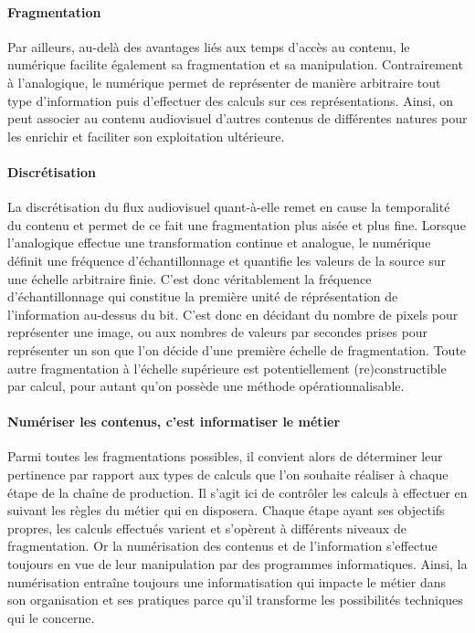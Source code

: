 \paragraph{Fragmentation}
Par ailleurs, au-delà des avantages liés aux temps d'accès au contenu, le numérique facilite également sa fragmentation et sa manipulation.
Contrairement à l'analogique, le numérique permet de représenter de manière arbitraire tout type d'information puis d'effectuer des calculs sur ces représentations. 
Ainsi, on peut associer au contenu audiovisuel d'autres contenus de différentes natures pour les enrichir et faciliter son exploitation ultérieure.

\paragraph{Discrétisation}
La discrétisation du flux audiovisuel quant-à-elle remet en cause la temporalité du contenu et permet de ce fait une fragmentation plus aisée et plus fine. 
Lorsque l'analogique effectue une transformation continue et analogue, le numérique définit une fréquence d'échantillonnage et quantifie les valeurs de la source sur une échelle arbitraire finie. 
C'est donc véritablement la fréquence d'échantillonnage qui constitue la première unité de réprésentation de l'information au-dessus du bit.
C'est donc en décidant du nombre de pixels pour représenter une image, ou aux nombres de valeurs par secondes prises pour représenter un son que l'on décide d'une première échelle de fragmentation. 
Toute autre fragmentation à l'échelle supérieure est potentiellement (re)constructible par calcul, pour autant qu'on possède une méthode opérationnalisable. 

\paragraph{Numériser les contenus, c'est informatiser le métier}
Parmi toutes les fragmentations possibles, il convient alors de déterminer leur pertinence par rapport aux types de calculs que l'on souhaite réaliser à chaque étape de la chaîne de production. 
Il s'agit ici de contrôler les calculs à effectuer en suivant les règles du métier qui en disposera.
Chaque étape ayant ses objectifs propres, les calculs effectués varient et s'opèrent à différents niveaux de fragmentation. 
Or la numérisation des contenus et de l'information s'effectue toujours en vue de leur manipulation par des programmes informatiques.
Ainsi, la numérisation entraîne toujours une informatisation qui impacte le métier dans son organisation et ses pratiques parce qu'il transforme les possibilités techniques qui le concerne.



